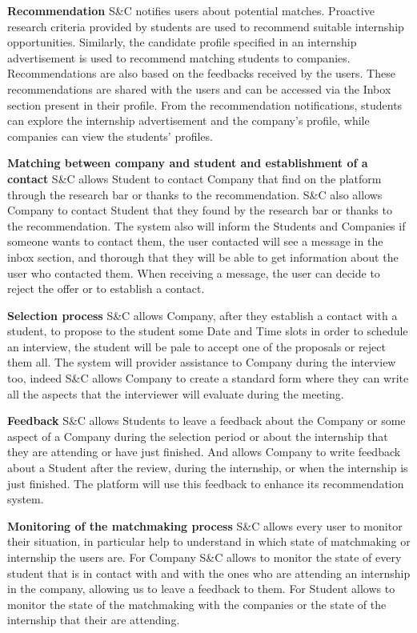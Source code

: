 \textbf{Recommendation}\newline
S\&C notifies users about potential matches. Proactive research criteria provided by students are used to recommend suitable internship opportunities. Similarly, the candidate profile specified in an internship advertisement is used to recommend matching students to companies. Recommendations are also based on the feedbacks received by the users. These recommendations are shared with the users and can be accessed via the Inbox section present in their profile. From the recommendation notifications, students can explore the internship advertisement and the company's profile, while companies can view the students' profiles.

\textbf{Matching between company and student and establishment of a contact}\newline
S\&C allows Student to contact Company that find on the platform through the research bar or thanks to the recommendation. S\&C also allows Company to contact Student that they found by the research bar or thanks to the recommendation. The system also will inform the Students and Companies if someone wants to contact them, the user contacted will see a message in the inbox section, and thorough that they will be able to get information about the user who contacted them. When receiving a message, the user can decide to reject the offer or to establish a contact.

\textbf{Selection process}\newline
S\&C allows Company, after they establish a contact with a student, to propose to the student some Date and Time slots in order to schedule an interview, the student will be pale to accept one of the proposals or reject them all. The system will provider assistance to Company during the interview too, indeed S\&C allows Company to create a standard form where they can write all the aspects that the interviewer will evaluate during the meeting.

\textbf{Feedback}\newline
S\&C allows Students to leave a feedback about the Company or some aspect of a Company during the selection period or about the internship that they are attending or have just finished. And allows Company to write feedback about a Student after the review, during the internship, or when the internship is just finished. The platform will use this feedback to enhance its recommendation system.

\textbf{Monitoring of the matchmaking process}\newline
S\&C allows every user to monitor their situation, in particular help to understand in which state of matchmaking or internship the users are. For Company S\&C allows to monitor the state of every student that is in contact with and with the ones who are attending an internship in the company, allowing us to leave a feedback to them. For Student allows to monitor the state of the matchmaking with the companies or the state of the internship that their are attending.

